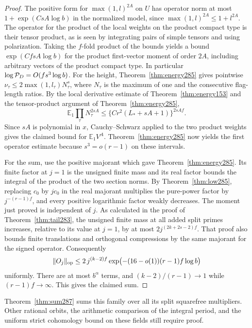\documentclass[a4paper,11pt]{article}
\theoremstyle{definition}
\theoremstyle{remark}
\numberwithin{equation}{section}
\begin{document}
\begin{proof}
The positive form for \(\max(1,l)^{2A}\) on \(U\) has operator
norm at most \(1+\exp(CsA\log b)\) in the normalized model,
since \(\max(1,l)^{2A}\le1+l^{2A}\).
The operator for the product of the local weights on the
product compact type is their tensor product, as is seen by
integrating pairs of simple tensors and using polarization.
Taking the \(f\)-fold product of the bounds yields
a bound \(\exp(CfsA\log b)\) for the product first-vector
moment of order \(2A\), including arbitrary vectors of the
product compact type. In particular \(\log{\cal P}_D=O(fs^3\log b)\).
For the height, Theorem~\ref{thm:energy285} gives pointwise
\(\nu_\tau\le2\max(1,l_\tau)N_\tau^s\), where \(N_\tau\)
is the maximum of one and the consecutive flag-length ratios.
By the local derivative estimate of Theorem~\ref{thm:energy153}
and the tensor-product argument of Theorem~\ref{thm:energy285},
\[
 \mathbb E_1\prod_\tau N_\tau^{2sA}
                 \le \{Cr^2(L_*+sA+1)\}^{2sAf}.
\]
Since \(sA\) is polynomial in \(x\), Cauchy--Schwarz applied
to the two product weights gives the claimed bound for
\(\mathbb E_1 V^A\). Theorem~\ref{thm:energy285}
now yields the first operator estimate because
\(s^3=o(r-1)\) on these intervals.

For the sum, use the positive majorant which gave
Theorem~\ref{thm:energy285}. Its finite factor at \(j=1\)
is the unsigned finite mass and its real factor bounds the
integral of the product of the two section norms.
By Theorem~\ref{thm:low285}, replacing \(c_0\) by \(j c_0\)
in the real majorant multiplies the pure-power factor by
\(j^{-(r-1)f}\), and every positive logarithmic factor
weakly decreases. The moment just proved is independent of
\(j\). As calculated in the proof of Theorem~\ref{thm:tail283},
the unsigned finite mass at all added split primes increases,
relative to its value at \(j=1\), by at most
\(2j^{(2k+2s-2)f}\). That proof also bounds finite translations
and orthogonal compressions by the same majorant for the
signed operator. Consequently
\[
 \|O_j\|_{\rm op}\le
   2\,j^{(k-2)f}\exp\bigl(-(16-o(1))(r-1)f\log b\bigr)
\]
uniformly. There are at most \(b^\alpha\) terms, and
\((k-2)/(r-1)\to1\) while \((r-1)f\to\infty\).
This gives the claimed sum.
\end{proof}

Theorem~\ref{thm:sum287} sums this family over all its split
squarefree multipliers. Other rational orbits, the arithmetic
comparison of the integral period, and the uniform strict
cohomology bound on these fields still require proof.
\end{document}
